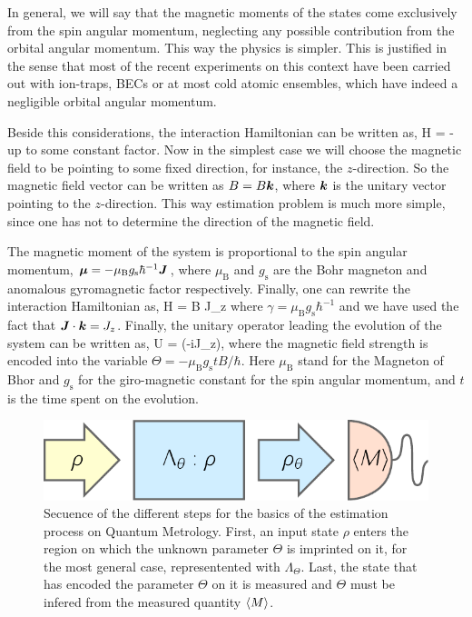 In general, we will say that the magnetic moments of the states come exclusively from the spin angular momentum, neglecting any possible contribution from the orbital angular momentum.
This way the physics is simpler.
This is justified in the sense that most of the recent experiments on this context have been carried out with ion-traps, BECs or at most cold atomic ensembles, which have indeed a negligible orbital angular momentum.

Beside this considerations, the interaction Hamiltonian can be written as,
\be
  H = - \bs{\mu} \cdot {}
\ee
up to some constant factor.
Now in the simplest case we will choose the magnetic field to be pointing to some fixed direction, for instance, the $z$-direction.
So the magnetic field vector can be written as ${B}=B\boldsymbol{k}$, where $\boldsymbol{k}$ is the unitary vector pointing to the $z$-direction.
This way estimation problem is much more simple, since one has not to determine the direction of the magnetic field.

The magnetic moment of the system is proportional to the spin angular momentum, $\boldsymbol{\mu}=-\mu_\text{B} g_{\text{s}}\hbar^{-1} \boldsymbol{J}$, where $\mu_{\text{B}}$ and $g_{\text{s}}$ are the Bohr magneton and anomalous gyromagnetic factor respectively.
Finally, one can rewrite the interaction Hamiltonian as,
\be
  H = \gamma B J_z
\ee
where $\gamma = \mu_\text{B} g_{\text{s}}\hbar^{-1}$ and we have used the fact that $\boldsymbol{J}\cdot\boldsymbol{k}=J_z$.
Finally, the unitary operator leading the evolution of the system can be written as,
\be
  U = \exp(-i\Theta J_z),
\ee
where the magnetic field strength is encoded into the variable $\Theta=-\mu_\text{B} g_\text{s} t B/\hbar$.
Here $\mu_\text{B}$ stand for the Magneton of Bhor and $g_\text{s}$ for the giro-magnetic constant for the spin angular momentum, and $t$ is the time spent on the evolution.

\begin{figure}
  \centering
  \includegraphics[scale=.85]{img/BG_preparation_encoding_estimation.pdf}
  \caption[Quantum Metrology estimation process]{Secuence of the different steps for the basics of the estimation process on Quantum Metrology. First, an input state $\rho$ enters the region on which the unknown parameter $\Theta$ is imprinted on it, for the most general case, representented with $\Lambda_{\Theta}$. Last, the state that has encoded the parameter $\Theta$ on it is measured and $\Theta$ must be infered from the measured quantity $\langle M \rangle$.}
  \label{fig:bg-preparation-encoding-estimation}
\end{figure}

